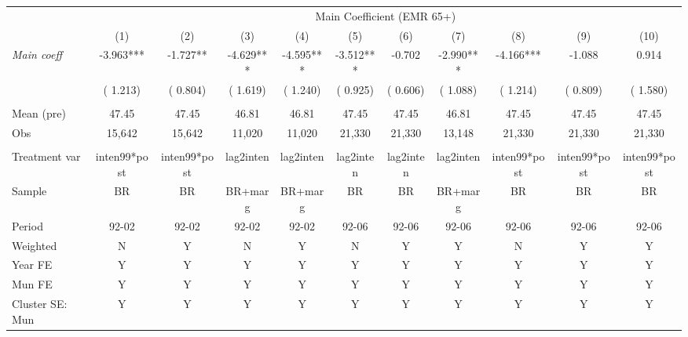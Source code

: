 \begin{tabular}{lcccccccccc} \hline \hline
& \multicolumn{10}{c}{Main Coefficient (EMR 65+)} \\ 
& \multicolumn{1}{c}{(1)} & \multicolumn{1}{c}{(2)} & \multicolumn{1}{c}{(3)} & \multicolumn{1}{c}{(4)} & \multicolumn{1}{c}{(5)} & \multicolumn{1}{c}{(6)} & \multicolumn{1}{c}{(7)} & \multicolumn{1}{c}{(8)} & \multicolumn{1}{c}{(9)} & \multicolumn{1}{c}{(10)} \\ \toprule
\textit{Main coeff} &       -3.963*** &       -1.727** &       -4.629*** &       -4.595*** &       -3.512*** &       -0.702 &       -2.990*** &       -4.166*** &       -1.088 &        0.914 \\ 
 & (       1.213) & (       0.804) & (       1.619) & (       1.240) & (       0.925) & (       0.606) & (       1.088) & (       1.214) & (       0.809) & (       1.580) \\ 
  & & & & & & & & & & \\ 
Mean (pre) &        47.45 &        47.45 &        46.81 &        46.81 &        47.45 &        47.45 &        46.81 &        47.45 &        47.45 &        47.45 \\ 
Obs &       15,642 &       15,642 &       11,020 &       11,020 &       21,330 &       21,330 &       13,148 &       21,330 &       21,330 &       21,330 \\ 
  & & & & & & & & & & \\ 
Treatment var & inten99*post & inten99*post & lag2inten & lag2inten & lag2inten & lag2inten & lag2inten & inten99*post & inten99*post & inten99*post \\ 
Sample & BR & BR & BR+marg & BR+marg & BR & BR & BR+marg & BR & BR & BR \\ 
Period & 92-02 & 92-02 & 92-02 & 92-02 & 92-06 & 92-06 & 92-06 & 92-06 & 92-06 & 92-06 \\ 
Weighted & N & Y & N & Y & N & Y & Y & N & Y & Y \\ 
Year FE & Y & Y & Y & Y & Y & Y & Y & Y & Y & Y \\ 
Mun FE & Y & Y & Y & Y & Y & Y & Y & Y & Y & Y \\ 
Cluster SE: Mun & Y & Y & Y & Y & Y & Y & Y & Y & Y & Y \\ 
\bottomrule
\end{tabular}